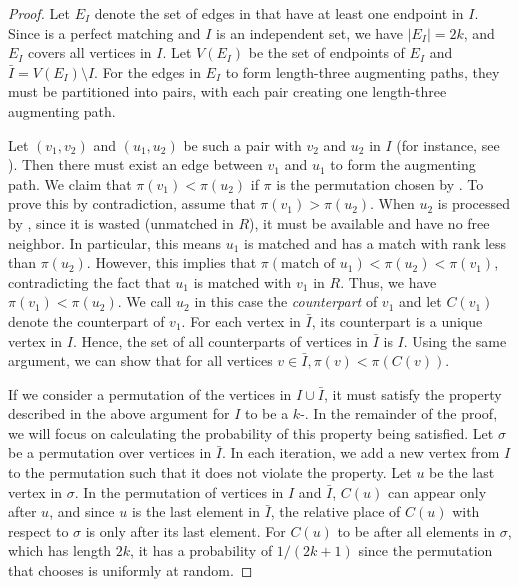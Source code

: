 \begin{proof}
Let $E_I$ denote the set of edges in \opt{} that have at least one endpoint in $I$. Since \opt{} is a perfect matching and $I$ is an independent set, we have $|E_I| = 2k$, and $E_I$ covers all vertices in $I$. Let $V(E_I)$ be the set of endpoints of $E_I$ and $\bar{I} = V(E_I) \setminus I$. For the edges in $E_I$ to form length-three augmenting paths, they must be partitioned into pairs, with each pair creating one length-three augmenting path.


Let \((v_1, v_2)\) and \((u_1, u_2)\) be such a pair with \(v_2\) and \(u_2\) in \(I\) (for instance, see ). Then there must exist an edge between \(v_1\) and \(u_1\) to form the augmenting path. We claim that \(\pi(v_1) < \pi(u_2)\) if $\pi$ is the permutation chosen by \rnk{}. To prove this by contradiction, assume that $\pi(v_1) > \pi(u_2)$. When $u_2$ is processed by \rnk{}, since it is wasted (unmatched in $R$), it must be available and have no free neighbor. In particular, this means $u_1$ is matched and has a match with rank less than $\pi(u_2)$. However, this implies that $\pi(\text{match of } u_1) < \pi(u_2) < \pi(v_1)$, contradicting the fact that $u_1$ is matched with $v_1$ in $R$. Thus, we have \(\pi(v_1) < \pi(u_2)\). We call $u_2$ in this case the {\em counterpart} of $v_1$ and let $C(v_1)$ denote the counterpart of $v_1$. For each vertex in $\bar{I}$, its counterpart is a unique vertex in $I$. Hence, the set of all counterparts of vertices in $\bar{I}$ is $I$. Using the same argument, we can show that for all vertices $v\in \bar{I}, \pi(v)< \pi(C(v))$.


If we consider a permutation of the vertices in $I \cup \bar{I}$, it must satisfy the property described in the above argument for $I$ to be a $k$-\wis{}. In the remainder of the proof, we will focus on calculating the probability of this property being satisfied. Let $\sigma$ be a permutation over vertices in $\bar{I}$. In each iteration, we add a new vertex from $I$ to the permutation such that it does not violate the property. Let $u$ be the last vertex in \(\sigma\). In the permutation of vertices in \(I\) and \(\bar{I}\), \(C(u)\) can appear only after \(u\), and since \(u\) is the last element in \(\bar{I}\), the relative place of \(C(u)\) with respect to \(\sigma\) is only after its last element. For \(C(u)\) to be after all elements in \(\sigma\), which has length \(2k\), it has a probability of \(1/(2k+1)\) since the permutation that \rnk{} chooses is uniformly at random. 



\end{proof}
